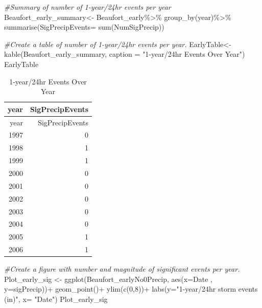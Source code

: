 \documentclass[
  12pt,
]{article}
\newenvironment{Shaded}{\begin{snugshade}}{\end{snugshade}}
\newcommand{\AttributeTok}[1]{\textcolor[rgb]{0.77,0.63,0.00}{#1}}
\newcommand{\CommentTok}[1]{\textcolor[rgb]{0.56,0.35,0.01}{\textit{#1}}}
\newcommand{\DecValTok}[1]{\textcolor[rgb]{0.00,0.00,0.81}{#1}}
\newcommand{\FunctionTok}[1]{\textcolor[rgb]{0.00,0.00,0.00}{#1}}
\newcommand{\NormalTok}[1]{#1}
\newcommand{\OtherTok}[1]{\textcolor[rgb]{0.56,0.35,0.01}{#1}}
\newcommand{\SpecialCharTok}[1]{\textcolor[rgb]{0.00,0.00,0.00}{#1}}
\newcommand{\StringTok}[1]{\textcolor[rgb]{0.31,0.60,0.02}{#1}}
\begin{document}
\begin{Shaded}
\begin{Highlighting}[]
\CommentTok{\#Summary of number of 1{-}year/24hr events per year}
\NormalTok{Beaufort\_early\_summary}\OtherTok{\textless{}{-}}\NormalTok{ Beaufort\_early}\SpecialCharTok{\%\textgreater{}\%}
  \FunctionTok{group\_by}\NormalTok{(year)}\SpecialCharTok{\%\textgreater{}\%}
  \FunctionTok{summarise}\NormalTok{(}\AttributeTok{SigPrecipEvents=} \FunctionTok{sum}\NormalTok{(NumSigPrecip))}

\CommentTok{\#Create a table of number of 1{-}year/24hr events per year.}
\NormalTok{EarlyTable}\OtherTok{\textless{}{-}} \FunctionTok{kable}\NormalTok{(Beaufort\_early\_summary, }\AttributeTok{caption =} \StringTok{"1{-}year/24hr Events Over Year"}\NormalTok{)}
\NormalTok{EarlyTable}
\end{Highlighting}
\end{Shaded}

\begin{longtable}[]{@{}rr@{}}
\caption{1-year/24hr Events Over Year}\tabularnewline
\toprule
year & SigPrecipEvents \\
\midrule
\endfirsthead
\toprule
year & SigPrecipEvents \\
\midrule
\endhead
1997 & 0 \\
1998 & 1 \\
1999 & 1 \\
2000 & 0 \\
2001 & 0 \\
2002 & 0 \\
2003 & 0 \\
2004 & 0 \\
2005 & 1 \\
2006 & 1 \\
\bottomrule
\end{longtable}

\begin{Shaded}
\begin{Highlighting}[]
\CommentTok{\#Create a figure with number and magnitude of significant events per year.}
\NormalTok{Plot\_early\_sig }\OtherTok{\textless{}{-}} \FunctionTok{ggplot}\NormalTok{(Beaufort\_earlyNo0Precip, }\FunctionTok{aes}\NormalTok{(}\AttributeTok{x=}\NormalTok{Date , }\AttributeTok{y=}\NormalTok{sigPrecip))}\SpecialCharTok{+}
  \FunctionTok{geom\_point}\NormalTok{()}\SpecialCharTok{+}
  \FunctionTok{ylim}\NormalTok{(}\FunctionTok{c}\NormalTok{(}\DecValTok{0}\NormalTok{,}\DecValTok{8}\NormalTok{))}\SpecialCharTok{+}
  \FunctionTok{labs}\NormalTok{(}\AttributeTok{y=}\StringTok{"1{-}year/24hr storm events (in)"}\NormalTok{, }\AttributeTok{x=} \StringTok{"Date"}\NormalTok{)}
\NormalTok{Plot\_early\_sig}
\end{Highlighting}
\end{Shaded}
\end{document}
